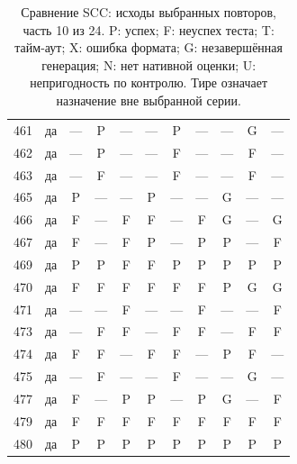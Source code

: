 \begin{table}[p]
\begin{tabular*}{\textwidth}{@{\extracolsep{\fill}}rc*{9}{c}@{}}
461 & да & — & P & — & — & P & — & — & G & —\\
462 & да & — & P & — & — & F & — & — & F & —\\
463 & да & — & F & — & — & F & — & — & F & —\\
465 & да & P & — & — & P & — & — & G & — & —\\
466 & да & F & — & F & F & — & F & G & — & G\\
467 & да & F & — & F & P & — & P & P & — & F\\
469 & да & P & P & F & F & P & P & P & P & P\\
470 & да & F & F & F & F & F & F & P & G & G\\
471 & да & — & — & F & — & — & F & — & — & F\\
473 & да & — & F & F & — & F & F & — & F & F\\
474 & да & F & F & — & F & F & — & P & F & —\\
475 & да & — & F & — & — & F & — & — & G & —\\
477 & да & F & — & P & P & — & P & G & — & F\\
479 & да & F & F & F & F & F & F & F & F & F\\
480 & да & P & P & P & P & P & P & P & P & P\\
\bottomrule\end{tabular*}
\caption{Сравнение SCC: исходы выбранных повторов, часть 10 из 24. P: успех; F: неуспех теста; T: тайм-аут; X: ошибка формата; G: незавершённая генерация; N: нет нативной оценки; U: непригодность по контролю. Тире означает назначение вне выбранной серии.}
\end{table}
\clearpage
